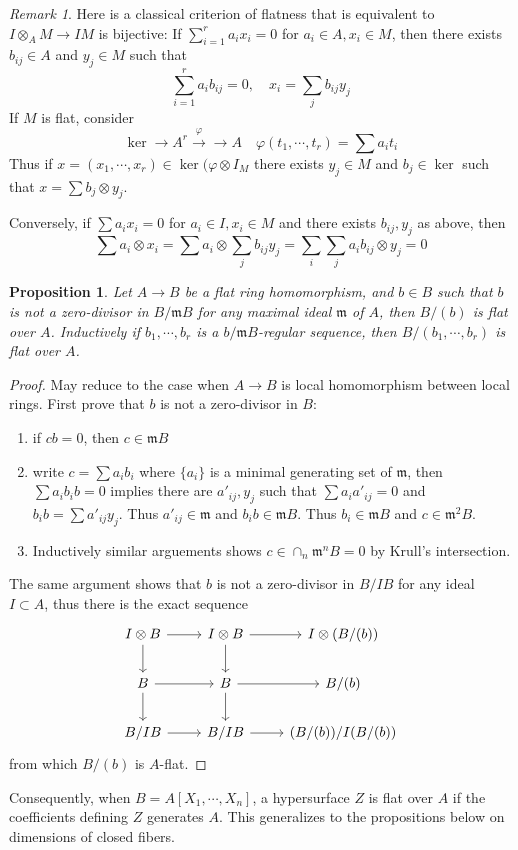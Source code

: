 \documentclass[leqno]{amsart}
\newcommand{\1}{\mathbf{1}}
\newcommand{\fm}{\mathfrak m}
\newtheorem{prop}[thm]{Proposition}
\theoremstyle{definition}
\theoremstyle{remark}
\newtheorem{rem}[thm]{Remark}
\begin{document}
\begin{rem}
	Here is a classical criterion
	of flatness that is equivalent
	to $I\otimes_AM\to IM$ is bijective:
	If  $\sum_{i=1}^ra_ix_i=0$
	for $a_i\in A, x_i\in M$,
	then there exists  $b_{ij}\in A$
	and $y_j\in M$ such that
	\[
		\sum_{i=1}^ra_ib_{ij}=0,\quad
		x_i=\sum_{j}b_{ij}y_j
	\]
	If $M$ is flat, consider 
	 \[
		 \ker\to A^r\xrightarrow{\varphi}
		 \to A\quad
		 \varphi(t_1,\cdots,t_r)=
		 \sum a_it_i
	\]
	Thus if 
	$x=(x_1,\cdots,x_r)\in \ker(\varphi\otimes I_M$
	there exists $y_j\in M$
	and  $b_j\in \ker$
	such that  $x=\sum b_j\otimes y_j$.

	Conversely, 
	if  $\sum a_ix_{i}=0$ 
	for $a_i\in I, x_i\in M$ 
	and there exists $b_{ij}, y_j$
	as above, 
	then
	\[
		\sum a_i\otimes x_i=
		\sum a_i\otimes \sum_j b_{ij}y_j=
		\sum_i \sum_ja_ib_{ij}\otimes y_j=
		0
	\]
\end{rem}

\begin{prop}
	Let $A\to B$ be a flat ring homomorphism,
	and  $b\in B$
	such that  $b$ is not a zero-divisor
	in  $B/\fm B$
	for any maximal ideal  $\fm$ of  $A$,
	then   $B/(b)$ is flat over  $A$.
	Inductively if $b_1,\cdots,b_r$
	is a $b/\fm B$-regular sequence,
	then  $B/(b_1,\cdots,b_r)$
	is flat over $A$.
\end{prop}
\begin{proof}
	May reduce to the case 
	when $A\to B$ is local homomorphism
	between local rings.
	First prove that $b$
	is not a zero-divisor in  $B$:
	\begin{enumerate}[label=(\alph*)]
		\item if $cb=0$, then 
			 $c\in \fm B$
		 \item write $c=\sum a_ib_i$
			 where  $\{a_i\}$ 
			 is a minimal generating set of $\fm$,
			 then  $\sum a_ib_ib=0$
			 implies there are 
			  $a'_{ij}, y_j$
			  such that $\sum a_ia'_{ij}=0$ and $b_ib=\sum a'_{ij}y_j$.
			  Thus $a'_{ij}\in \fm$
			  and $b_ib\in \fm B$.
			  Thus  $b_i\in \fm B$
			  and  $c\in \fm^2 B$.
		  \item Inductively similar 
			  arguements shows
			   $c\in \cap_n \fm^n B=0$
			   by Krull's intersection.
	\end{enumerate}
	The same argument shows that
	$b$ is not a zero-divisor in
	$B/IB$ for any ideal $I\subset A$,
	thus there is the exact sequence
	 \[
		\begin{tikzcd}
			I\otimes B \arrow[r]\arrow[d] &
			I\otimes B \arrow[r]\arrow[d] & I\otimes(B/(b)) \\
			B \arrow[r]\arrow[d] &
			B \arrow[r]\arrow[d] &
			B/(b) \\
			B/IB \arrow[r] &
			B/IB \arrow[r] &
			(B/(b))/I(B/(b))
		\end{tikzcd}
	\]
	from which $B/(b)$ is  $A$-flat.
\end{proof}
Consequently, when $B=A[X_1,\cdots,X_n]$,
a hypersurface $Z$ is flat over  $A$
if the coefficients defining  $Z$
generates $A$.
This generalizes to the propositions
below on dimensions of closed fibers.
\end{document}
